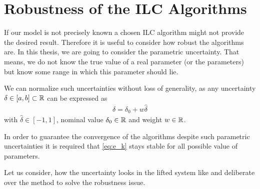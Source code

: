 \chapter{Robustness of the ILC Algorithms}
\label{ch:Robustness}
If our model is not precisely known a chosen ILC algorithm might not provide the desired result. 
Therefore it is useful to consider how robust the algorithms are. 
In this thesis, we are going to consider the parametric uncertainty. That means, we do not know the true value of a real parameter (or the parameters) but know some range in which this parameter should lie. 

We can normalize such uncertainties without loss of generality, as any uncertainty $\delta \in [a,b] \subset {\mathbb{R}}$ can be expressed as 
\begin{align}
\label{eq:rob:del=del0+...}
\delta = \delta_0 + w \hat{\delta}
\end{align}
with $\hat{\delta} \in [-1,1]$, nominal value $\delta_0 \in {\mathbb{R}}$ and weight $w\in {\mathbb{R}}$. 

%

In order to guarantee the convergence of the algorithms despite such parametric uncertainties it is required that \eqref{eq:e_k}  stays stable for all possible value of parameters.

Let us consider, how the uncertainty looks in the lifted system like and deliberate over the method to solve the robustness issue. 





